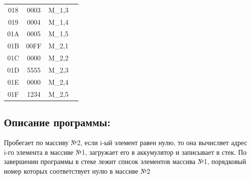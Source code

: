 \begin{center}
\begin{tabular}{|c|c|c|l|}
        018                   & 0003                  & M_{1,3}            &                                                   \\
        019                   & 0004                  & M_{1,4}            &                                                   \\
        01A                   & 0005                  & M_{1,5}            &                                                   \\
        \hline
        01B                   & 00FF                  & M_{2,1}            &                                                   \\
        01C                   & 0000                  & M_{2,2}            &                                                   \\
        01D                   & 5555                  & M_{2,3}            &                                                   \\
        01E                   & 0000                  & M_{2,4}            &                                                   \\
        01F                   & 1234                  & M_{2,5}            &                                                   \\
        \hline
    \end{tabular}
\end{center}

\subsection{Описание программы:}
Пробегает по массиву №2, если i-ый элемент равен нулю, то она вычисляет адрес i-го элемента в массиве №1, загружает
его в аккумулятор и записывает в стек. По завершении программы в стеке лежит список элементов массива №1, порядковый
номер которых соответствует нулю в массиве №2